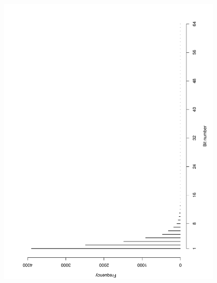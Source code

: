 \documentclass[10pt]{article}
\begin{document}
\begin{figure}[h]
{   \includegraphics[scale=0.25,angle=-90,clip]{fig03}
  }
\end{figure}
\end{document}
